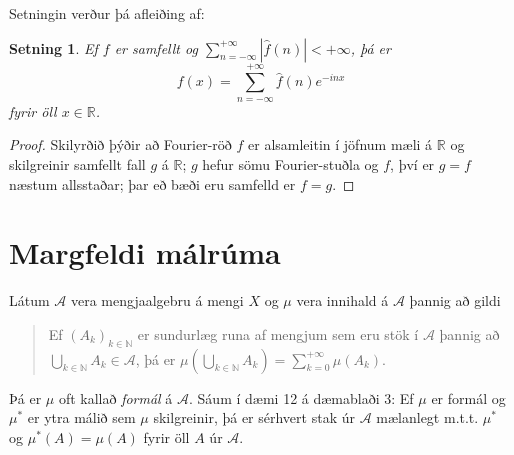 \documentclass[a4paper,icelandic,11pt]{book}
\theoremstyle{plain}      \newtheorem{setn}{Setning}[chapter]
\theoremstyle{definition} \newtheorem{skilgr}[setn]{Skilgreining}
\theoremstyle{remark}     \newtheorem*{ath}{Athugasemd}
\newcommand{\R}{\mathbb R}
\newcommand{\N}{\mathbb N}
\begin{document}
Setningin verður þá afleiðing af:
\begin{setn}
  Ef $f$ er samfellt og $\sum_{n=-\infty}^{+\infty}\left| \hat f(n)
  \right| < +\infty$, þá er 
  \[
  f(x) = \sum_{n=-\infty}^{+\infty}\hat f(n)e^{-inx}
  \]
  fyrir öll $x\in\R$.
\end{setn}
\begin{proof}
  Skilyrðið þýðir að Fourier-röð $f$ er alsamleitin í jöfnum mæli á
  $\R$ og skilgreinir samfellt fall $g$ á $\R$; $g$ hefur sömu
  Fourier-stuðla og $f$, því er $g=f$ næstum allsstaðar; þar eð bæði
  eru samfelld er $f=g$.
\end{proof}
\chapter{Margfeldi málrúma}

Látum $\mathcal A$ vera mengjaalgebru á mengi $X$ og $\mu$ vera innihald
á $\mathcal A$ þannig að gildi
\begin{quote}
  Ef $(A_k)_{k\in\N}$ er sundurlæg runa af mengjum sem eru stök í
  $\mathcal A$ þannig að $\bigcup_{k\in\N}A_k\in\mathcal A$, þá er
  $\mu\left( \bigcup_{k\in\N}A_k \right)=\sum_{k=0}^{+\infty}\mu(A_k)$.
\end{quote}
Þá er $\mu$ oft kallað \emph{formál} á $\mathcal
A$. Sáum í dæmi 12 á dæmablaði 3: Ef $\mu$ er formál og $\mu^*$ er ytra
málið sem $\mu$ skilgreinir, þá er sérhvert stak úr $\mathcal A$
mælanlegt m.t.t. $\mu^*$ og $\mu^*(A)=\mu(A)$ fyrir öll $A$ úr $\mathcal
A$. 
\end{document}
